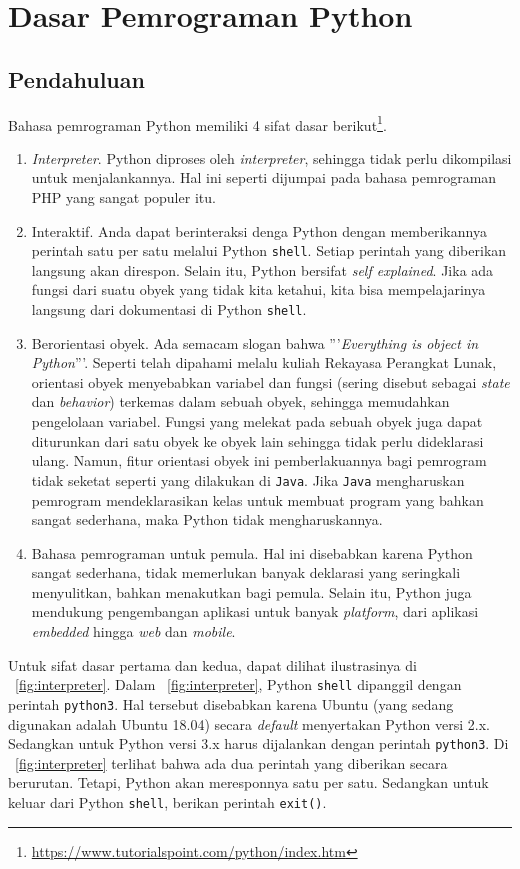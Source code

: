 \chapter{Dasar Pemrograman Python}
\section{Pendahuluan}
Bahasa pemrograman Python memiliki 4 sifat dasar berikut\footnote{\url{https://www.tutorialspoint.com/python/index.htm}}.
\begin{enumerate}
  \item \textit{Interpreter}. Python diproses oleh \textit{interpreter}, sehingga tidak perlu dikompilasi untuk menjalankannya. Hal ini seperti dijumpai pada bahasa pemrograman PHP yang sangat populer itu.
  \item Interaktif. Anda dapat berinteraksi denga Python dengan memberikannya perintah satu per satu melalui Python \texttt{shell}. Setiap perintah yang diberikan langsung akan direspon. Selain itu, Python bersifat \textit{self explained}. Jika ada fungsi dari suatu obyek yang tidak kita ketahui, kita bisa mempelajarinya langsung dari dokumentasi di Python \texttt{shell}.
  \item Berorientasi obyek. Ada semacam slogan bahwa '''\textit{Everything is object in Python}'''. Seperti telah dipahami melalu kuliah Rekayasa Perangkat Lunak, orientasi obyek menyebabkan variabel dan fungsi (sering disebut sebagai \textit{state} dan \textit{behavior}) terkemas dalam sebuah obyek, sehingga memudahkan pengelolaan variabel. Fungsi yang melekat pada sebuah obyek juga dapat diturunkan dari satu obyek ke obyek lain sehingga tidak perlu dideklarasi ulang. Namun, fitur orientasi obyek ini pemberlakuannya bagi pemrogram tidak seketat seperti yang dilakukan di \texttt{Java}. Jika \texttt{Java} mengharuskan pemrogram mendeklarasikan kelas untuk membuat program yang bahkan sangat sederhana, maka Python tidak mengharuskannya.
  \item Bahasa pemrograman untuk pemula. Hal ini disebabkan karena Python sangat sederhana, tidak memerlukan banyak deklarasi yang seringkali menyulitkan, bahkan menakutkan bagi pemula. Selain itu, Python juga mendukung pengembangan aplikasi untuk banyak \textit{platform}, dari aplikasi \textit{embedded} hingga \textit{web} dan \textit{mobile}. 
\end{enumerate}

Untuk sifat dasar pertama dan kedua, dapat dilihat ilustrasinya di \figurename~\ref{fig:interpreter}. Dalam \figurename~\ref{fig:interpreter}, Python \texttt{shell} dipanggil dengan perintah \texttt{python3}. Hal tersebut disebabkan karena Ubuntu (yang sedang digunakan adalah Ubuntu 18.04) secara \textit{default} menyertakan Python versi 2.x. Sedangkan untuk Python versi 3.x harus dijalankan dengan perintah \texttt{python3}. Di \figurename~\ref{fig:interpreter} terlihat bahwa ada dua perintah yang diberikan secara berurutan. Tetapi, Python akan meresponnya satu per satu. Sedangkan untuk keluar dari Python \texttt{shell}, berikan perintah \texttt{exit()}.

